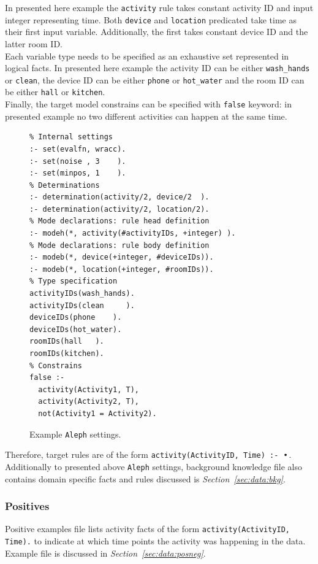 \documentclass[10pt, a4paper, pdflatex, leqno, twoside, openright]{report}
\DeclareMathOperator*{\Bigcdot}{\scalerel*{\cdot}{\bigodot}}
\begin{document}
In presented here example the \texttt{activity} rule takes constant activity ID and input integer representing time. Both \texttt{device} and \texttt{location} predicated take time as their first input variable. Additionally, the first takes constant device ID and the latter room ID.\\
Each variable type needs to be specified as an exhaustive set represented in logical facts. In presented here example the activity ID can be either \texttt{wash\_hands} or \texttt{clean}, the device ID can be either \texttt{phone} or \texttt{hot\_water} and the room ID can be either \texttt{hall} or \texttt{kitchen}.\\
Finally, the target model constrains can be specified with \texttt{false} keyword: in presented example no two different activities can happen at the same time.\\

\begin{figure}[htb] %
  \begin{verbatim}
% Internal settings
:- set(evalfn, wracc).
:- set(noise , 3    ).
:- set(minpos, 1    ).
% Determinations
:- determination(activity/2, device/2  ).
:- determination(activity/2, location/2).
% Mode declarations: rule head definition
:- modeh(*, activity(#activityIDs, +integer) ).
% Mode declarations: rule body definition
:- modeb(*, device(+integer, #deviceIDs)).
:- modeb(*, location(+integer, #roomIDs)).
% Type specification
activityIDs(wash_hands).
activityIDs(clean     ).
deviceIDs(phone    ).
deviceIDs(hot_water).
roomIDs(hall   ).
roomIDs(kitchen).
% Constrains
false :-
  activity(Activity1, T),
  activity(Activity2, T),
  not(Activity1 = Activity2).
  \end{verbatim}
  \caption{Example \texttt{Aleph} settings.\label{lst:alephSettings}}
\end{figure}

Therefore, target rules are of the form \texttt{activity(ActivityID, Time) :- $\Bigcdot$}.\\

Additionally to presented above \texttt{Aleph} settings, background knowledge file also contains domain specific facts and rules discussed is \emph{Section~\ref{sec:data:bkg}}.

      \subsubsection{Positives}
Positive examples file lists activity facts of the form \texttt{activity(ActivityID, Time).} to indicate at which time points the activity was happening in the data. Example file is discussed in \emph{Section~\ref{sec:data:posneg}}.
\end{document}
